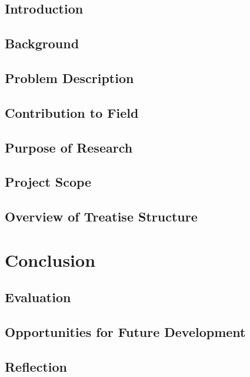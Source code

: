 	\section{Introduction}
	
	\section{Background}
	
	\section{Problem Description}
	
	\section{Contribution to Field}
	
	\section{Purpose of Research}
	
	\section{Project Scope}
	
	\section{Overview of Treatise Structure}
	
\chapter{Conclusion}
	\section{Evaluation}
	
	\section{Opportunities for Future Development}
	
	\section{Reflection}

